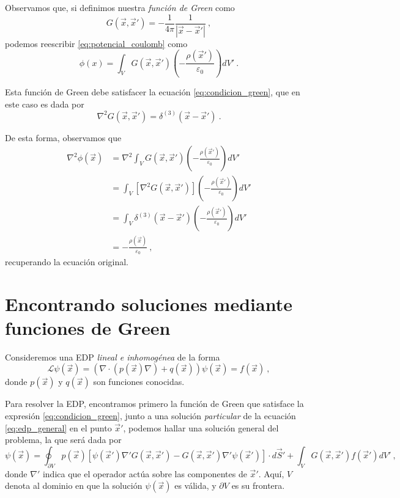 Observamos que, si definimos nuestra \emph{función de Green} como
\begin{equation}\label{eq:green_laplaciano}
    G(\vec{x}, \vec{x}') = - \frac{1}{4\pi} \frac{1}{|\vec{x} - \vec{x}'|} \ ,
\end{equation}
podemos reescribir \eqref{eq:potencial_coulomb} como
\begin{equation}
    \phi(x) = \int_V G(\vec{x}, \vec{x}') \left( - \frac{\rho(\vec{x}')}{\varepsilon_0} \right) dV' \ .
\end{equation}

Esta función de Green debe satisfacer la ecuación \eqref{eq:condicion_green}, que en este caso es dada por
\begin{equation}
    \nabla^2 G(\vec{x}, \vec{x}') = \delta^{(3)} (\vec{x} - \vec{x}') \ .
\end{equation}

De esta forma, observamos que
\begin{align}
    \nabla^2 \phi(\vec{x}) & = \nabla^2 \int_V G(\vec{x}, \vec{x}') \left( - \frac{\rho(\vec{x}')}{\varepsilon_0} \right) dV' \\
    & = \int_V [\nabla^2 G(\vec{x}, \vec{x}')] \left( - \frac{\rho(\vec{x}')}{\varepsilon_0} \right) dV' \\
    & = \int_V \delta^{(3)}(\vec{x} - \vec{x}') \left( - \frac{\rho(\vec{x}')}{\varepsilon_0} \right) dV'\\
    & = - \frac{\rho(\vec{x})}{\varepsilon_0} \ ,
\end{align}
recuperando la ecuación original.

\section{Encontrando soluciones mediante funciones de Green}

Consideremos una EDP \emph{lineal e inhomogénea} de la forma
\begin{equation}\label{eq:edp_general}
    \mathcal{L} \psi(\vec{x}) = \left(\nabla \cdot (p(\vec{x}) \nabla) + q(\vec{x})\right)\psi(\vec{x}) = f(\vec{x}) \ ,
\end{equation}
donde $p(\vec{x})$ y $q(\vec{x})$ son funciones conocidas.

Para resolver la EDP, encontramos primero la función de Green que satisface la expresión \eqref{eq:condicion_green}, junto a una solución \emph{particular} de la ecuación \eqref{eq:edp_general} en el punto $\vec{x}'$, podemos hallar una solución general del problema, la que será dada por
\begin{equation}\label{eq:solucion_green}
    \psi(\vec{x}) = \oint_{\partial V} p(\vec{x})[\psi(\vec{x}') \nabla' G(\vec{x}, \vec{x}') - G(\vec{x}, \vec{x}') \nabla' \psi(\vec{x}')] \cdot d\vec{S}' + \int_V G(\vec{x}, \vec{x}') f(\vec{x}') dV' \ ,
\end{equation}
donde $\nabla'$ indica que el operador actúa sobre las componentes de $\vec{x}'$. Aquí, $V$ denota al dominio en que la solución $\psi(\vec{x})$ es válida, y $\partial V$ es su frontera.

